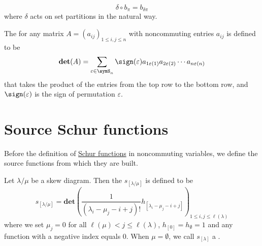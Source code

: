 \begin{equation}
\delta \circ b_\pi = b_{\delta\pi}
\end{equation}
where $\delta$ acts on set partitions in the natural way.


The 
\label{noncommutativeDeterminant}
for any matrix $A=(a_{ij}) _{1\leq i,j\leq n}$ with noncommuting entries $a_{ij}$
is defined to be
\begin{equation}
\mathbf{det}(A) =
\sum_{\varepsilon \in \symS_n}
\sign (\varepsilon) a_{1\varepsilon (1)}a_{2\varepsilon (2)}
\dotsm a_{n\varepsilon (n)}
\end{equation}
that takes the product of the entries from the top
row to the bottom row, and $\sign (\varepsilon)$ is
the sign of permutation $\varepsilon$.



\section[sourceSchur]{Source Schur functions}

Before the definition of \hyperref[schurS]{Schur functions} in noncommuting
variables, we define the source functions from which they are built.

\begin{definition}
Let $\lambda / \mu$ be a skew diagram.
Then the 
\label{sourceSkewSchurNoncommuting}
$s_{[\lambda/\mu]}$ is defined to be
\begin{equation}
s_{[\lambda/\mu]} =
\mathbf{det} \left( \frac{1}{(\lambda _i -\mu _j - i +j)! }
h_{[\lambda _i -\mu_j - i + j]}\right) _{1\leq i,j \leq \ell(\lambda)}
\end{equation}
where we set $\mu_j = 0$ for all $\ell(\mu) \lt j \leq \ell(\lambda)$, $h_{[0]}=h_\emptyset = 1$
and any function with a negative index equals 0.
When $\mu = \emptyset$, we call $s_{[\lambda]}$
a 
\label{sourceSchurNoncommuting}.
\end{definition}


